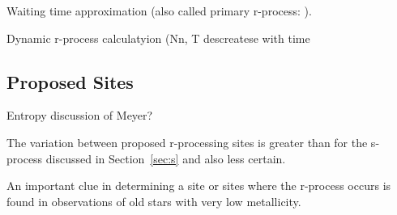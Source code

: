 Waiting time approximation (also called primary r-process: \citealt{meyer1994}).

Dynamic r-process calculatyion (Nn, T descreatese with time


\subsection{Proposed Sites}

Entropy discussion of Meyer?

The variation between proposed r-processing sites is greater than for
the s-process discussed in Section~\ref{sec:s} and also less certain.  

An important clue in determining a site or sites where the r-process
occurs is found in observations of old stars with very low
metallicity.   
